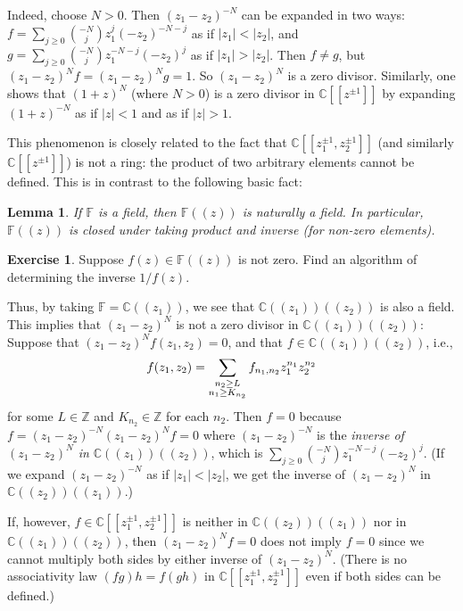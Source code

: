 \documentclass[11pt,b5paper,notitlepage]{article}
\theoremstyle{definition}
\newtheorem{exe}[df]{Exercise}
\theoremstyle{plain}
\newtheorem{lm}[df]{Lemma}
\newcommand{\mbb}{\mathbb}
\newcommand{\Cbb}{\mathbb C}
\newcommand{\Zbb}{\mathbb Z}
\numberwithin{equation}{section}
\begin{document}
Indeed, choose $N>0$. Then $(z_1-z_2)^{-N}$ can be expanded in two ways: $f=\sum_{j\geq 0}{-N\choose j}z_1^j(-z_2)^{-N-j}$ as if $|z_1|<|z_2|$, and $g=\sum_{j\geq 0}{-N\choose j}z_1^{-N-j}(-z_2)^j$ as if $|z_1|>|z_2|$. Then $f\neq g$, but $(z_1-z_2)^Nf=(z_1-z_2)^Ng=1$. So $(z_1-z_2)^N$ is a zero divisor. Similarly, one shows that $(1+z)^N$ (where $N>0$) is a zero divisor in $\Cbb[[z^{\pm1}]]$ by expanding $(1+z)^{-N}$ as if $|z|<1$ and as if $|z|>1$.


This phenomenon is closely related to the fact that $\Cbb[[z_1^{\pm1},z_2^{\pm1}]]$ (and similarly $\Cbb[[z^{\pm1}]]$) is not a ring: the product of two arbitrary elements cannot be defined. This is in contrast to the following basic fact:
\begin{lm}
If $\mbb F$ is a field, then $\mbb F((z))$ is naturally a field. In particular, $\mbb F((z))$ is closed under taking product and inverse (for non-zero elements).
\end{lm}

\begin{exe}
Suppose $f(z)\in\mbb F((z))$ is not zero. Find an algorithm of determining the inverse $1/f(z)$.
\end{exe}

Thus, by taking $\mbb F=\Cbb((z_1))$, we see that $\Cbb((z_1))((z_2))$ is also a field. This implies that $(z_1-z_2)^N$ is not a zero divisor in $\Cbb((z_1))((z_2))$: Suppose that $(z_1-z_2)^Nf(z_1,z_2)=0$,  and that $f\in\Cbb((z_1))((z_2))$, i.e., 
\begin{align*}
f(z_1,z_2)=\sum_{\begin{subarray}{c}
	n_2\geq L\\	
n_1\geq K_{n_2} 
\end{subarray}}f_{n_1,n_2}z_1^{n_1}z_2^{n_2}
\end{align*}
for some $L\in\Zbb$ and $K_{n_2}\in\Zbb$ for each $n_2$. Then $f=0$ because $f=(z_1-z_2)^{-N}(z_1-z_2)^Nf=0$ where $(z_1-z_2)^{-N}$ is the \emph{inverse of $(z_1-z_2)^N$ in $\Cbb((z_1))((z_2))$}, which is  $\sum_{j\geq0}{-N\choose j}z_1^{-N-j}(-z_2)^j$. (If we expand $(z_1-z_2)^{-N}$ as if $|z_1|<|z_2|$, we get the inverse of $(z_1-z_2)^N$ in $\Cbb((z_2))((z_1))$.)

If, however, $f\in\Cbb[[z_1^{\pm1},z_2^{\pm1}]]$ is neither in $\Cbb((z_2))((z_1))$ nor in $\Cbb((z_1))((z_2))$, then $(z_1-z_2)^Nf=0$ does not imply $f=0$ since we cannot multiply both sides by either inverse of $(z_1-z_2)^N$. (There is no associativity law $(fg)h=f(gh)$ in $\Cbb[[z_1^{\pm1},z_2^{\pm1}]]$ even if both sides can be defined.)
\end{document}
